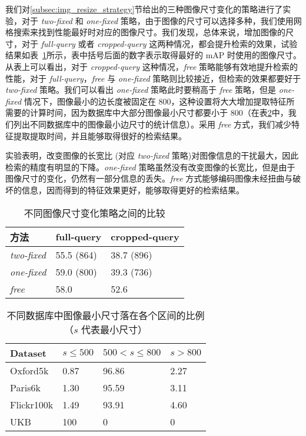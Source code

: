 我们对\ref{subsec:img_resize_strategy}节给出的三种图像尺寸变化的策略进行了实验，对于 \emph{two-fixed} 和
\emph{one-fixed} 策略，由于图像的尺寸可以选择多种，我们使用网格搜索来找到性能最好时对应的图像尺寸。我们发现，总体来说，增加图像的尺寸，对于 \emph{full-query} 或者 \emph{cropped-query} 这两种情况，都会提升检索的效果，试验结果如表~\ref{table:image_size_impact}所示，表中括号后面的数字表示取得最好的 mAP 时使用的图像尺寸。从表上可以看出，对于 \emph{cropped-query} 这种情况，\emph{free} 策略能够有效地提升检索的性能，对于 \emph{full-query}，\emph{free} 与 \emph{one-fixed} 策略则比较接近，但检索的效果都要好于 \emph{two-fixed} 策略。我们可以看出 \emph{one-fixed} 策略此时要稍高于 \emph{free} 策略，但是 \emph{one-fixed} 情况下，图像最小的边长度被固定在 800，这种设置将大大增加提取特征所需要的计算时间，因为数据库中大部分图像最小尺寸都要小于 800（在表\ref{table:min_size_distribution}中，我们列出不同数据库中的图像最小边尺寸的统计信息）。采用 \emph{free} 方式，我们减少特征提取提取时间，并且能够取得很好的检索结果。

实验表明，改变图像的长宽比 (对应 \emph{two-fixed} 策略)对图像信息的干扰最大，因此检索的精度有明显的下降。\emph{one-fixed} 策略虽然没有改变图像的长宽比，但是由于图像尺寸的变化，仍然有一部分信息的丢失。\emph{free} 方式能够编码图像未经扭曲与破坏的信息，因而得到的特征效果更好，能够取得更好的检索结果。

\begin{table}[!t]
	\centering
	\caption{不同图像尺寸变化策略之间的比较}
	\label{table:image_size_impact}
	\begin{tabular}{lll}
		\toprule
		方法		    & full-query			& cropped-query \\
		\midrule
		\emph{two-fixed}		&		55.5 (864)		& 	38.7 (896)	\\
		\emph{one-fixed}		&		59.0 (800) 		&	39.3 (736)\\
		\emph{free}				&		58.0	 		&	52.6 	\\
		\bottomrule
	\end{tabular}
\end{table}

\begin{table}[!t]
	\centering
	\caption{不同数据库中图像最小尺寸落在各个区间的比例（$s$ 代表最小尺寸）}
	\label{table:min_size_distribution}
	\begin{tabular}{llll}
		\toprule
		Dataset & $s\leq 500$ & $500<s\leq 800$&  $s>800$ \\
		\midrule
		Oxford5k & 0.87 & 96.86 & 2.27 \\
		Paris6k & 1.30  & 95.59 & 3.11 \\
		Flickr100k & 1.49 & 93.91 & 4.60\\
		UKB & 100 & 0 & 0 \\
		\bottomrule
	\end{tabular}
	\end{table}

